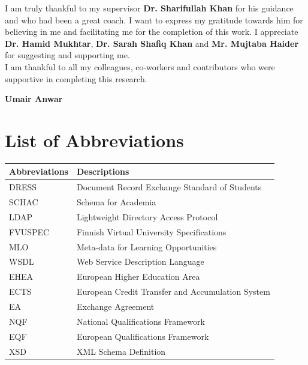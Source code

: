 \documentclass[12pt,a4paper,oneside]{book}
\begin{document}
I am truly thankful to my supervisor {\bfseries Dr. Sharifullah Khan} for his guidance and who had been a great coach. I want to express my gratitude towards him for believing in me and facilitating me for the completion of this work. I appreciate {\bfseries Dr. Hamid Mukhtar}, {\bfseries Dr. Sarah Shafiq Khan} and {\bfseries Mr. Mujtaba Haider} for suggesting and supporting me. \\

I am thankful to all my colleagues, co-workers and contributors who were supportive in completing this research.

\begin{flushright} \textbf{Umair Anwar} \end{flushright}

\tableofcontents
%
%
%
\chapter*{List of Abbreviations}

\begin{table}[h]
    \renewcommand{\arraystretch}{1.3}
    \label{table:table1}
     \begin{tabular}{ll}
        \hline\hline
            {\bfseries Abbreviations} & {\bfseries Descriptions} \\
            \hline                                      %
            DRESS & Document Record Exchange Standard of Students  \\
            SCHAC & Schema for Academia  \\
            LDAP & Lightweight Directory Access Protocol \\
            FVUSPEC & Finnish Virtual University Specifications  \\
            MLO & Meta-data for Learning Opportunities  \\
            WSDL & Web Service Description Language  \\
            EHEA & European Higher Education Area  \\
            ECTS & European Credit Transfer and Accumulation System  \\
            EA & Exchange Agreement  \\
            NQF & National Qualifications Framework  \\
            EQF & European Qualifications Framework  \\
            XSD & XML Schema Definition  \\
            \hline                          %
    \end{tabular}
\end{table}
\end{document}
